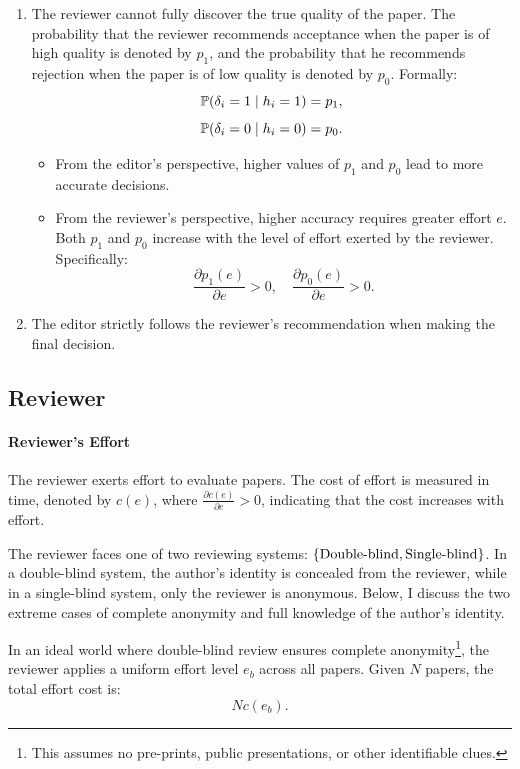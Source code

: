 \documentclass[12pt]{article}
\begin{document}
\begin{enumerate}
    \item The reviewer cannot fully discover the true quality of the paper. The
          probability that the reviewer recommends acceptance when the paper is of high
          quality is denoted by $p_1$, and the probability that he recommends rejection
          when the paper is of low quality is denoted by $p_0$. Formally:
          \[
              \mathbb{P}(\delta_i = 1 \mid h_i = 1) = p_1,
          \]
          \[
              \mathbb{P}(\delta_i = 0 \mid h_i = 0) = p_0.
          \]
          \begin{itemize}
              \item From the editor's perspective, higher values of $p_1$ and $p_0$ lead to more
                    accurate decisions.
              \item From the reviewer's perspective, higher accuracy requires greater effort $e$.
                    Both $p_1$ and $p_0$ increase with the level of effort exerted by the reviewer.
                    Specifically:
                    \[
                        \frac{\partial p_1(e)}{\partial e} > 0, \quad \frac{\partial p_0(e)}{\partial e} > 0.
                    \]
          \end{itemize}

    \item The editor strictly follows the reviewer's recommendation when making the final
          decision.
\end{enumerate}

\subsection{Reviewer}
\paragraph{Reviewer's Effort}
The reviewer exerts effort to evaluate papers. The cost of effort is measured
in time, denoted by $c(e)$, where $\frac{\partial c(e)}{\partial e} > 0$,
indicating that the cost increases with effort.

The reviewer faces one of two reviewing systems: $\left\{\text{Double-blind},
        \text{Single-blind}\right\}$. In a double-blind system, the author’s identity is
concealed from the reviewer, while in a single-blind system, only the reviewer
is anonymous. Below, I discuss the two extreme cases of complete anonymity and
full knowledge of the author’s identity.

In an ideal world where double-blind review ensures complete
anonymity\footnote{This assumes no pre-prints, public presentations, or other
    identifiable clues.}, the reviewer applies a uniform effort level $e_b$ across
all papers. Given $N$ papers, the total effort cost is:
\[
    Nc(e_b).
\]
\end{document}
